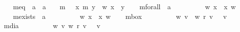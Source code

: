 \begin{isabellebody}
\ \ \isamarkupfalse%
\ meq\ {\isacharcolon}{\isacharcolon}\ {\isachardoublequoteopen}{\isacharprime}a\ {\isasymRightarrow}\ {\isacharprime}a\ {\isasymRightarrow}\ {\isasymsigma}{\isachardoublequoteclose}\ {\isacharparenleft}\ {\isachardoublequoteopen}m{\isacharequal}{\isachardoublequoteclose}\ {}{}{\isacharparenright}\ \ {\isachardoublequoteopen}x\ m{\isacharequal}\ y\ {\isasymequiv}\ {\isacharparenleft}{\isasymlambda}w{\isachardot}\ x\ {\isacharequal}\ y{\isacharparenright}{\isachardoublequoteclose}\isanewline
\ \ \isamarkupfalse%
\ mforall\ {\isacharcolon}{\isacharcolon}\ {\isachardoublequoteopen}{\isacharparenleft}{\isacharprime}a\ {\isasymRightarrow}\ {\isasymsigma}{\isacharparenright}\ {\isasymRightarrow}\ {\isasymsigma}{\isachardoublequoteclose}\ {\isacharparenleft}{\isachardoublequoteopen}{\isasymforall}{\isachardoublequoteclose}{\isacharparenright}\ \ {\isachardoublequoteopen}{\isasymforall}\ {\isasymPhi}\ {\isasymequiv}\ {\isacharparenleft}{\isasymlambda}w{\isachardot}\ {\isasymforall}x{\isachardot}\ {\isasymPhi}\ x\ w{\isacharparenright}{\isachardoublequoteclose}\ \ \ \isanewline
\ \ \isamarkupfalse%
\ mexists\ {\isacharcolon}{\isacharcolon}\ {\isachardoublequoteopen}{\isacharparenleft}{\isacharprime}a\ {\isasymRightarrow}\ {\isasymsigma}{\isacharparenright}\ {\isasymRightarrow}\ {\isasymsigma}{\isachardoublequoteclose}\ {\isacharparenleft}{\isachardoublequoteopen}{\isasymexists}{\isachardoublequoteclose}{\isacharparenright}\ \ {\isachardoublequoteopen}{\isasymexists}\ {\isasymPhi}\ {\isasymequiv}\ {\isacharparenleft}{\isasymlambda}w{\isachardot}\ {\isasymexists}x{\isachardot}\ {\isasymPhi}\ x\ w{\isacharparenright}{\isachardoublequoteclose}\isanewline
\ \ \isamarkupfalse%
\ mbox\ {\isacharcolon}{\isacharcolon}\ {\isachardoublequoteopen}{\isasymsigma}\ {\isasymRightarrow}\ {\isasymsigma}{\isachardoublequoteclose}\ {\isacharparenleft}{\isachardoublequoteopen}{\isasymbox}{\isachardoublequoteclose}{\isacharparenright}\ \ {\isachardoublequoteopen}{\isasymbox}\ {\isasymphi}\ {\isasymequiv}\ {\isacharparenleft}{\isasymlambda}w{\isachardot}\ {\isasymforall}v{\isachardot}\ \ w\ r\ v\ {\isasymlongrightarrow}\ {\isasymphi}\ v{\isacharparenright}{\isachardoublequoteclose}\isanewline
\ \ \isamarkupfalse%
\ mdia\ {\isacharcolon}{\isacharcolon}\ {\isachardoublequoteopen}{\isasymsigma}\ {\isasymRightarrow}\ {\isasymsigma}{\isachardoublequoteclose}\ {\isacharparenleft}{\isachardoublequoteopen}{\isasymdiamond}{\isachardoublequoteclose}{\isacharparenright}\ \ {\isachardoublequoteopen}{\isasymdiamond}\ {\isasymphi}\ {\isasymequiv}\ {\isacharparenleft}{\isasymlambda}w{\isachardot}\ {\isasymexists}v{\isachardot}\ w\ r\ v\ {\isasymand}\ {\isasymphi}\ v{\isacharparenright}{\isachardoublequoteclose}%

\end{isabellebody}
